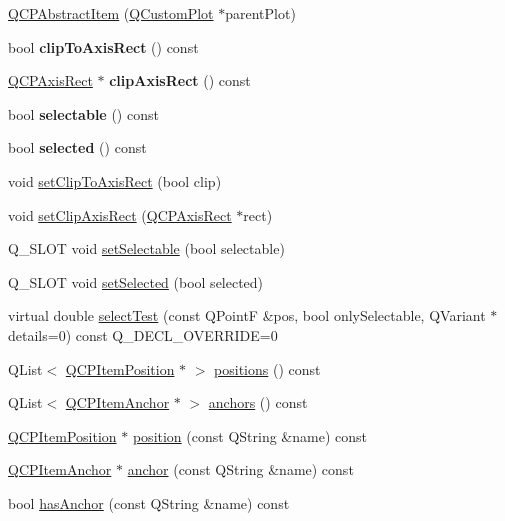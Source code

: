 \begin{DoxyCompactItemize}
\item 
\hyperlink{classQCPAbstractItem_a9922507d8b4503a1fe1ed0b1030e23b6}{Q\+C\+P\+Abstract\+Item} (\hyperlink{classQCustomPlot}{Q\+Custom\+Plot} $\ast$parent\+Plot)
\item 
\mbox{\label{classQCPAbstractItem_a42715ad5f3d7fca6854025fa5636f436}} 
bool {\bfseries clip\+To\+Axis\+Rect} () const
\item 
\mbox{\label{classQCPAbstractItem_ae162314efd3fe1a6d4df11da1d275d52}} 
\hyperlink{classQCPAxisRect}{Q\+C\+P\+Axis\+Rect} $\ast$ {\bfseries clip\+Axis\+Rect} () const
\item 
\mbox{\label{classQCPAbstractItem_ae29aa489767352b40c4aaa7ea50c5582}} 
bool {\bfseries selectable} () const
\item 
\mbox{\label{classQCPAbstractItem_aa069fba320a13639f119f82ad29ead96}} 
bool {\bfseries selected} () const
\item 
void \hyperlink{classQCPAbstractItem_a39e05b9d4176b9accafc746d16ca6a06}{set\+Clip\+To\+Axis\+Rect} (bool clip)
\item 
void \hyperlink{classQCPAbstractItem_a7dc75fcbcd10206fe0b75d757ea7a347}{set\+Clip\+Axis\+Rect} (\hyperlink{classQCPAxisRect}{Q\+C\+P\+Axis\+Rect} $\ast$rect)
\item 
Q\+\_\+\+S\+L\+OT void \hyperlink{classQCPAbstractItem_a8a8e32a55bc478b849756a78c2d87fd2}{set\+Selectable} (bool selectable)
\item 
Q\+\_\+\+S\+L\+OT void \hyperlink{classQCPAbstractItem_a203de94ad586cc44d16c9565f49d3378}{set\+Selected} (bool selected)
\item 
virtual double \hyperlink{classQCPAbstractItem_ae41d0349d68bb802c49104afd100ba2a}{select\+Test} (const Q\+PointF \&pos, bool only\+Selectable, Q\+Variant $\ast$details=0) const Q\+\_\+\+D\+E\+C\+L\+\_\+\+O\+V\+E\+R\+R\+I\+DE=0
\item 
Q\+List$<$ \hyperlink{classQCPItemPosition}{Q\+C\+P\+Item\+Position} $\ast$ $>$ \hyperlink{classQCPAbstractItem_a709f655ac3f7f22d452714134662b454}{positions} () const
\item 
Q\+List$<$ \hyperlink{classQCPItemAnchor}{Q\+C\+P\+Item\+Anchor} $\ast$ $>$ \hyperlink{classQCPAbstractItem_a81d1ecfea3368b836cf9675a0045e659}{anchors} () const
\item 
\hyperlink{classQCPItemPosition}{Q\+C\+P\+Item\+Position} $\ast$ \hyperlink{classQCPAbstractItem_a2589c3d298f9a576d77d9addb440a18d}{position} (const Q\+String \&name) const
\item 
\hyperlink{classQCPItemAnchor}{Q\+C\+P\+Item\+Anchor} $\ast$ \hyperlink{classQCPAbstractItem_a139c255ea8831642fac91748e29a5adb}{anchor} (const Q\+String \&name) const
\item 
bool \hyperlink{classQCPAbstractItem_a84914f4516f9b38ef0bd89eafe3dbda7}{has\+Anchor} (const Q\+String \&name) const
\end{DoxyCompactItemize}
